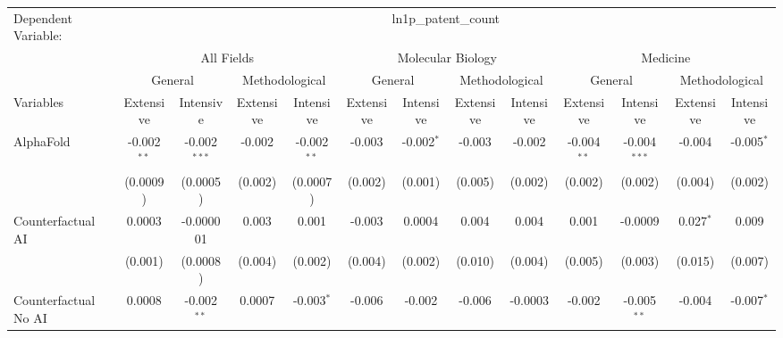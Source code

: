 \begingroup
\centering
\begin{tabular}{lcccccccccccc}
   \tabularnewline \midrule \midrule
   Dependent Variable: & \multicolumn{12}{c}{ln1p\_patent\_count}\\
 & \multicolumn{4}{c}{All Fields} & \multicolumn{4}{c}{Molecular Biology} & \multicolumn{4}{c}{Medicine} \\
\cmidrule(lr){2-5} \cmidrule(lr){6-9} \cmidrule(lr){10-13}
 & \multicolumn{2}{c}{General} & \multicolumn{2}{c}{Methodological} & \multicolumn{2}{c}{General} & \multicolumn{2}{c}{Methodological} & \multicolumn{2}{c}{General} & \multicolumn{2}{c}{Methodological} \\
\cmidrule(lr){2-3} \cmidrule(lr){4-5} \cmidrule(lr){6-7} \cmidrule(lr){8-9} \cmidrule(lr){10-11} \cmidrule(lr){12-13}
Variables & \multicolumn{1}{c}{Extensive} & \multicolumn{1}{c}{Intensive} & \multicolumn{1}{c}{Extensive} & \multicolumn{1}{c}{Intensive} & \multicolumn{1}{c}{Extensive} & \multicolumn{1}{c}{Intensive} & \multicolumn{1}{c}{Extensive} & \multicolumn{1}{c}{Intensive} & \multicolumn{1}{c}{Extensive} & \multicolumn{1}{c}{Intensive} & \multicolumn{1}{c}{Extensive} & \multicolumn{1}{c}{Intensive} \\
\cmidrule(lr){1-1}\cmidrule(lr){2-2} \cmidrule(lr){3-3} \cmidrule(lr){4-4} \cmidrule(lr){5-5} \cmidrule(lr){6-6} \cmidrule(lr){7-7} \cmidrule(lr){8-8} \cmidrule(lr){9-9} \cmidrule(lr){10-10} \cmidrule(lr){11-11} \cmidrule(lr){12-12} \cmidrule(lr){13-13}
   AlphaFold                                & -0.002$^{**}$ & -0.002$^{***}$ & -0.002  & -0.002$^{**}$ & -0.003  & -0.002$^{*}$ & -0.003  & -0.002   & -0.004$^{**}$ & -0.004$^{***}$ & -0.004      & -0.005$^{*}$\\   
                                            & (0.0009)      & (0.0005)       & (0.002) & (0.0007)      & (0.002) & (0.001)      & (0.005) & (0.002)  & (0.002)       & (0.002)        & (0.004)     & (0.002)\\   
   Counterfactual AI                        & 0.0003        & -0.000001      & 0.003   & 0.001         & -0.003  & 0.0004       & 0.004   & 0.004    & 0.001         & -0.0009        & 0.027$^{*}$ & 0.009\\   
                                            & (0.001)       & (0.0008)       & (0.004) & (0.002)       & (0.004) & (0.002)      & (0.010) & (0.004)  & (0.005)       & (0.003)        & (0.015)     & (0.007)\\   
   Counterfactual No AI                     & 0.0008        & -0.002$^{**}$  & 0.0007  & -0.003$^{*}$  & -0.006  & -0.002       & -0.006  & -0.0003  & -0.002        & -0.005$^{**}$  & -0.004      & -0.007$^{*}$\\   

\end{tabular}
